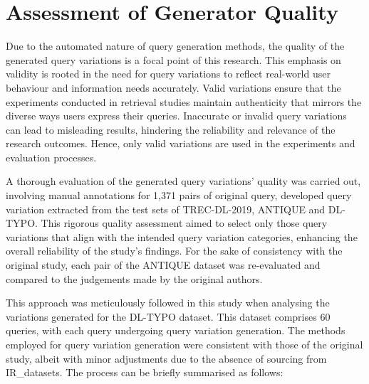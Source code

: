 \section{Assessment of Generator Quality}
Due to the automated nature of query generation methods, the quality of the generated query variations is a focal point of this research. This emphasis on validity is rooted in the need for query variations to reflect real-world user behaviour and information needs accurately. Valid variations ensure that the experiments conducted in retrieval studies maintain authenticity that mirrors the diverse ways users express their queries. Inaccurate or invalid query variations can lead to misleading results, hindering the reliability and relevance of the research outcomes. Hence, only valid variations are used in the experiments and evaluation processes. 

A thorough evaluation of the generated query variations' quality was carried out, involving manual annotations for 1,371 pairs of {original query, developed query variation} extracted from the test sets of TREC-DL-2019, ANTIQUE and DL-TYPO. This rigorous quality assessment aimed to select only those query variations that align with the intended query variation categories, enhancing the overall reliability of the study's findings. For the sake of consistency with the original study, each pair of the ANTIQUE dataset was re-evaluated and compared to the judgements made by the original authors.

This approach was meticulously followed in this study when analysing the variations generated for the DL-TYPO dataset. This dataset comprises 60 queries, with each query undergoing query variation generation. The methods employed for query variation generation were consistent with those of the original study, albeit with minor adjustments due to the absence of sourcing from IR\_datasets. The process can be briefly summarised as follows:

